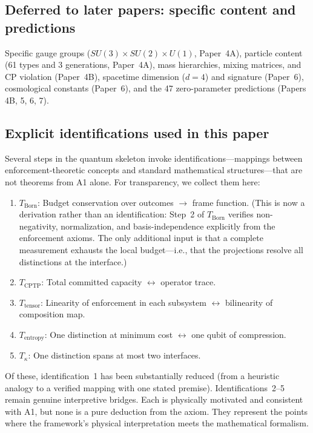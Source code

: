 \documentclass[11pt]{article}
\begin{document}
\subsection{Deferred to later papers: specific content and predictions}

Specific gauge groups ($SU(3) \times SU(2) \times U(1)$, Paper~4A), particle content (61 types and 3 generations, Paper~4A), mass hierarchies, mixing matrices, and CP violation (Paper~4B), spacetime dimension ($d=4$) and signature (Paper~6), cosmological constants (Paper~6), and the 47 zero-parameter predictions (Papers 4B, 5, 6, 7).

\subsection{Explicit identifications used in this paper}

Several steps in the quantum skeleton invoke identifications---mappings between enforcement-theoretic concepts and standard mathematical structures---that are not theorems from A1 alone.  For transparency, we collect them here:

\begin{enumerate}
  \item \textit{$T_{\mathrm{Born}}$}: Budget conservation over outcomes $\to$ frame function.  (This is now a derivation rather than an identification: Step~2 of $T_{\mathrm{Born}}$ verifies non-negativity, normalization, and basis-independence explicitly from the enforcement axioms.  The only additional input is that a complete measurement exhausts the local budget---i.e., that the projections resolve all distinctions at the interface.)
  \item \textit{$T_{\mathrm{CPTP}}$}: Total committed capacity $\leftrightarrow$ operator trace.
  \item \textit{$T_{\mathrm{tensor}}$}: Linearity of enforcement in each subsystem $\leftrightarrow$ bilinearity of composition map.
  \item \textit{$T_{\mathrm{entropy}}$}: One distinction at minimum cost $\leftrightarrow$ one qubit of compression.
  \item \textit{$T_\kappa$}: One distinction spans at most two interfaces.
\end{enumerate}

Of these, identification~1 has been substantially reduced (from a heuristic analogy to a verified mapping with one stated premise).  Identifications~2--5 remain genuine interpretive bridges.  Each is physically motivated and consistent with A1, but none is a pure deduction from the axiom.  They represent the points where the framework's physical interpretation meets the mathematical formalism.
\end{document}
